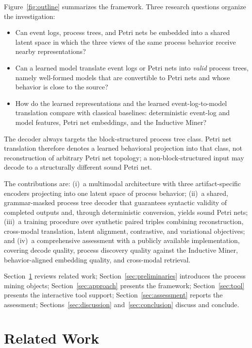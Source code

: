 \documentclass[manuscript,screen,nonacm]{acmart}
\begin{document}
Figure~\ref{fig:outline} summarizes the framework. Three research questions organize the investigation:

\begin{itemize}
  \item[\textbf{RQ1}] Can event logs, process trees, and Petri nets be embedded into a shared latent space in which the three views of the same process behavior receive nearby representations?
  \item[\textbf{RQ2}] Can a learned model translate event logs or Petri nets into \emph{valid} process trees, namely well-formed models that are convertible to Petri nets and whose behavior is close to the source?
  \item[\textbf{RQ3}] How do the learned representations and the learned event-log-to-model translation compare with classical baselines: deterministic event-log and model features, Petri net embeddings, and the Inductive Miner?
\end{itemize}

The decoder always targets the block-structured process tree class. Petri net translation therefore denotes a learned behavioral projection into that class, not reconstruction of arbitrary Petri net topology; a non-block-structured input may decode to a structurally different sound Petri net.

The contributions are: (i)~a multimodal architecture with three artifact-specific encoders projecting into one latent space of process behavior; (ii)~a shared, grammar-masked process tree decoder that guarantees syntactic validity of completed outputs and, through deterministic conversion, yields sound Petri nets; (iii)~a training procedure over synthetic paired triples combining reconstruction, cross-modal translation, latent alignment, contrastive, and variational objectives; and (iv)~a comprehensive assessment with a publicly available implementation, covering decode quality, process discovery quality against the Inductive Miner, behavior-aligned embedding quality, and cross-modal retrieval.

Section~\ref{sec:relatedWork} reviews related work; Section~\ref{sec:preliminaries} introduces the process mining objects; Section~\ref{sec:approach} presents the framework; Section~\ref{sec:tool} presents the interactive tool support; Section~\ref{sec:assessment} reports the assessment; Sections~\ref{sec:discussion} and~\ref{sec:conclusion} discuss and conclude.

\section{Related Work}
\label{sec:relatedWork}
\end{document}
